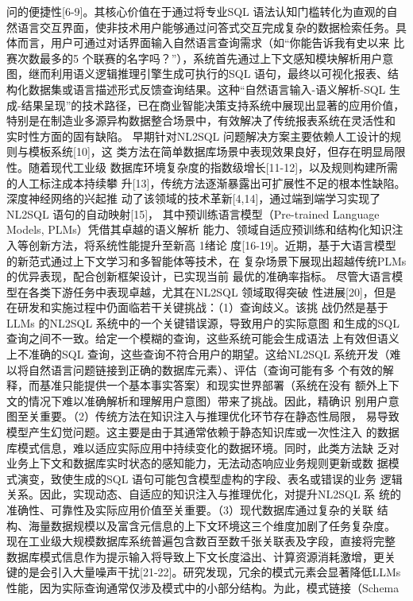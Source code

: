 \documentclass[12pt,a4paper,openright,UTF8]{ctexbook}
\begin{document}
问的便捷性[6-9]。其核心价值在于通过将专业SQL 语法认知门槛转化为直观的自 然语言交互界面，使非技术用户能够通过问答式交互完成复杂的数据检索任务。具 体而言，用户可通过对话界面输入自然语言查询需求（如“你能告诉我有史以来 比赛次数最多的5 个联赛的名字吗？”），系统首先通过上下文感知模块解析用户意 图，继而利用语义逻辑推理引擎生成可执行的SQL 语句，最终以可视化报表、结 构化数据集或语言描述形式反馈查询结果。这种“自然语言输入-语义解析-SQL 生 成-结果呈现”的技术路径，已在商业智能决策支持系统中展现出显著的应用价值， 特别是在制造业多源异构数据整合场景中，有效解决了传统报表系统在灵活性和 实时性方面的固有缺陷。 早期针对NL2SQL 问题解决方案主要依赖人工设计的规则与模板系统[10]，这 类方法在简单数据库场景中表现效果良好，但存在明显局限性。随着现代工业级 数据库环境复杂度的指数级增长[11-12]，以及规则构建所需的人工标注成本持续攀 升[13]，传统方法逐渐暴露出可扩展性不足的根本性缺陷。深度神经网络的兴起推 动了该领域的技术革新[4,14]，通过端到端学习实现了NL2SQL 语句的自动映射[15]， 其中预训练语言模型（Pre-trained Language Models, PLMs）凭借其卓越的语义解析 能力、领域自适应预训练和结构化知识注入等创新方法，将系统性能提升至新高 1绪论 度[16-19]。近期，基于大语言模型的新范式通过上下文学习和多智能体等技术，在 复杂场景下展现出超越传统PLMs 的优异表现，配合创新框架设计，已实现当前 最优的准确率指标。 尽管大语言模型在各类下游任务中表现卓越，尤其在NL2SQL 领域取得突破 性进展[20]，但是在研发和实施过程中仍面临若干关键挑战：（1）查询歧义。该挑 战仍然是基于LLMs 的NL2SQL 系统中的一个关键错误源，导致用户的实际意图 和生成的SQL 查询之间不一致。给定一个模糊的查询，这些系统可能会生成语法 上有效但语义上不准确的SQL 查询，这些查询不符合用户的期望。这给NL2SQL 系统开发（难以将自然语言问题链接到正确的数据库元素）、评估（查询可能有多 个有效的解释，而基准只能提供一个基本事实答案）和现实世界部署（系统在没有 额外上下文的情况下难以准确解析和理解用户意图）带来了挑战。因此，精确识 别用户意图至关重要。（2）传统方法在知识注入与推理优化环节存在静态性局限， 易导致模型产生幻觉问题。这主要是由于其通常依赖于静态知识库或一次性注入 的数据库模式信息，难以适应实际应用中持续变化的数据环境。同时，此类方法缺 乏对业务上下文和数据库实时状态的感知能力，无法动态响应业务规则更新或数 据模式演变，致使生成的SQL 语句可能包含模型虚构的字段、表名或错误的业务 逻辑关系。因此，实现动态、自适应的知识注入与推理优化，对提升NL2SQL 系 统的准确性、可靠性及实际应用价值至关重要。（3）现代数据库通过复杂的关联 结构、海量数据规模以及富含元信息的上下文环境这三个维度加剧了任务复杂度。 现在工业级大规模数据库系统普遍包含数百至数千张关联表及字段，直接将完整 数据库模式信息作为提示输入将导致上下文长度溢出、计算资源消耗激增，更关 键的是会引入大量噪声干扰[21-22]。研究发现，冗余的模式元素会显著降低LLMs 性能，因为实际查询通常仅涉及模式中的小部分结构。为此，模式链接（Schema 
\end{document}
